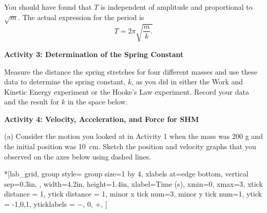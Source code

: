 You should have found that $T$ is independent of amplitude 
and proportional to \( \sqrt{m} \). The actual expression for the period is
\[T=2\pi \sqrt{\frac{m}{k}.}\]


%

\textbf{Activity 3: Determination of the Spring Constant }

Measure the distance the spring stretches for four different masses and use
these data to determine the spring constant, $k$, as you did in either the Work and Kinetic Energy experiment or the Hooke's Law experiment. Record your data and the result for $k$ in the space below.
\answerspace{40mm}

\pagebreak[2]
\textbf{Activity 4: Velocity, Acceleration, and Force for SHM} 

(a) Consider the motion you looked at in Activity 1 when the mass was 200 g
and the initial position was 10~cm. Sketch the position and velocity graphs
that you observed on the axes below using dashed lines.


\begin{lab_groupplot}*{}[lab_grid,
	group style={
		group size=1 by 4,
		xlabels at=edge bottom,
		vertical sep=0.3in,
		},
	width=4.2in,  height=1.4in,
	xlabel=Time (s),
	xmin=0, xmax=3,
	xtick distance = 1, 
	ytick distance = 1, 
	minor x tick num=3,
	minor y tick num=1,
	ytick = {-1,0,1},
	yticklabels = {$-$, 0, $+$},
	]
\nextgroupplot[
	ytick distance = 1, 
	minor y tick num=3,
	ymin=0,ymax=1, 
	ylabel={Position (m)},
	]
\nextgroupplot[
	ymin=-1,ymax=1, 
	ylabel={Velocity (m/s)},
	]
\nextgroupplot[
	ymin=-1,ymax=1, 
	ylabel={Acceleration (m/s$^2$)},
	]
\nextgroupplot[
	ymin=-1,ymax=1, 
	ylabel={Force (N)},
	]
\end{lab_groupplot}

